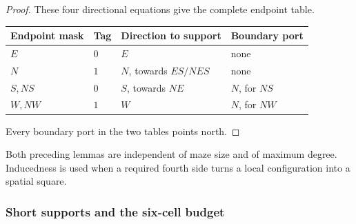 \begin{proof}
These four directional equations give the complete endpoint table.
\begin{center}
\small
\begin{tabular}{@{}llll@{}}
\toprule
Endpoint mask & Tag & Direction to support & Boundary port\\
\midrule
\(E\) & \(0\) & \(E\) & none\\
\(N\) & \(1\) & \(N\), towards \(ES/NES\) & none\\
\(S,NS\) & \(0\) & \(S\), towards \(NE\) & \(N\), for \(NS\)\\
\(W,NW\) & \(1\) & \(W\) & \(N\), for \(NW\)\\
\bottomrule
\end{tabular}
\end{center}
Every boundary port in the two tables points north.
\end{proof}

Both preceding lemmas are independent of maze size and of maximum degree.
Inducedness is used when a required fourth side turns a local configuration
into a spatial square.

\subsubsection{Short supports and the six-cell budget}


